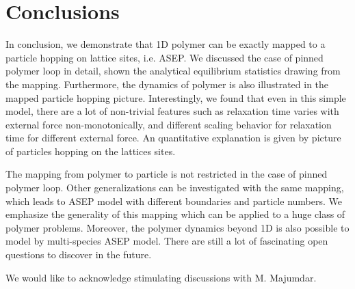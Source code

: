 \documentclass[aps,showpacs,twocolumn,floatfix,prx,superscriptaddress]{revtex4-1}
\begin{document}
%
\section{Conclusions}
In conclusion, we demonstrate that 1D polymer can be exactly mapped to a
particle hopping on lattice sites, i.e. ASEP.  We discussed the case of pinned
polymer loop in detail, shown the analytical equilibrium statistics drawing
from the mapping. Furthermore, the dynamics of polymer is also illustrated
in the mapped particle hopping picture. Interestingly, we found that even in
this simple model, there are a lot of non-trivial features such as relaxation
time varies with external force non-monotonically, and different scaling
behavior for relaxation time for different external force. An quantitative
explanation is given by picture of particles hopping on the lattices sites.  

The mapping from polymer to particle is not restricted in the case of pinned
polymer loop. Other generalizations can be investigated with the same mapping,
which leads to ASEP model with different boundaries and particle numbers. We
emphasize the generality of this mapping which can be applied to a huge class of
polymer problems. Moreover, the polymer dynamics beyond 1D is also possible to
model by multi-species ASEP model. There are still a lot of fascinating open
questions to discover in the future.

\begin{acknowledgments}
We would like to acknowledge stimulating discussions with M. Majumdar.\end{acknowledgments}

%
\end{document}
